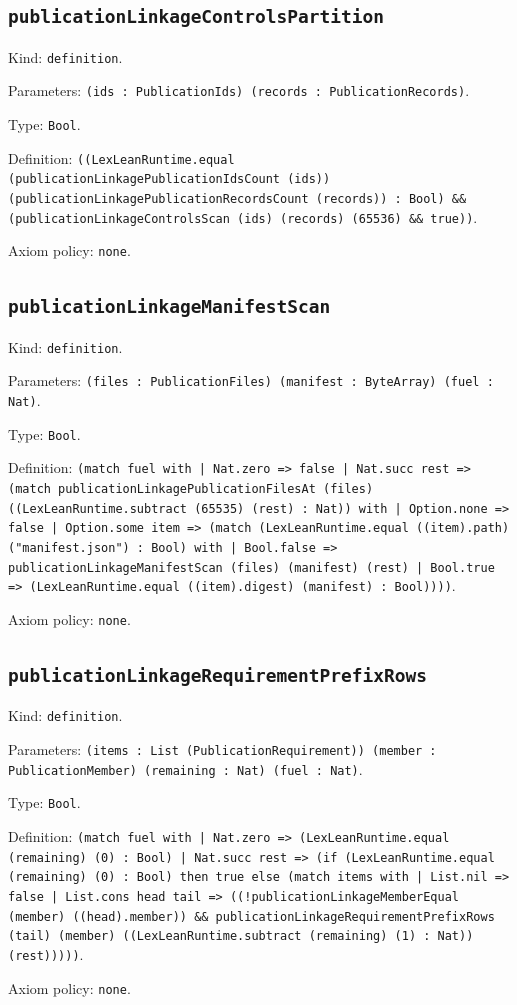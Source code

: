 \documentclass[11pt]{article}
\begin{document}
\subsection*{\texttt{publicationLinkageControlsPartition}}
\noindent Kind: \texttt{definition}.\par
\noindent Parameters: \texttt{(ids : PublicationIds) (records : PublicationRecords)}.\par
\noindent Type: \texttt{Bool}.\par
\noindent Definition: \texttt{((LexLeanRuntime.equal (publicationLinkagePublicationIdsCount (ids)) (publicationLinkagePublicationRecordsCount (records)) : Bool) \&\& (publicationLinkageControlsScan (ids) (records) (65536) \&\& true))}.\par
\noindent Axiom policy: \texttt{none}.\par
\subsection*{\texttt{publicationLinkageManifestScan}}
\noindent Kind: \texttt{definition}.\par
\noindent Parameters: \texttt{(files : PublicationFiles) (manifest : ByteArray) (fuel : Nat)}.\par
\noindent Type: \texttt{Bool}.\par
\noindent Definition: \texttt{(match fuel with | Nat.zero => false | Nat.succ rest => (match publicationLinkagePublicationFilesAt (files) ((LexLeanRuntime.subtract (65535) (rest) : Nat)) with | Option.none => false | Option.some item => (match (LexLeanRuntime.equal ((item).path) ("manifest.json") : Bool) with | Bool.false => publicationLinkageManifestScan (files) (manifest) (rest) | Bool.true => (LexLeanRuntime.equal ((item).digest) (manifest) : Bool))))}.\par
\noindent Axiom policy: \texttt{none}.\par
\subsection*{\texttt{publicationLinkageRequirementPrefixRows}}
\noindent Kind: \texttt{definition}.\par
\noindent Parameters: \texttt{(items : List (PublicationRequirement)) (member : PublicationMember) (remaining : Nat) (fuel : Nat)}.\par
\noindent Type: \texttt{Bool}.\par
\noindent Definition: \texttt{(match fuel with | Nat.zero => (LexLeanRuntime.equal (remaining) (0) : Bool) | Nat.succ rest => (if (LexLeanRuntime.equal (remaining) (0) : Bool) then true else (match items with | List.nil => false | List.cons head tail => ((!publicationLinkageMemberEqual (member) ((head).member)) \&\& publicationLinkageRequirementPrefixRows (tail) (member) ((LexLeanRuntime.subtract (remaining) (1) : Nat)) (rest)))))}.\par
\noindent Axiom policy: \texttt{none}.\par
\end{document}
